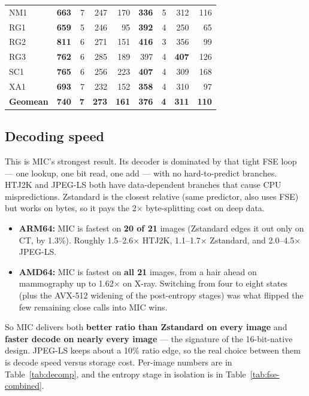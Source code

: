 \documentclass[11pt]{article}
\begin{document}
\begin{table}[htbp]
{\begin{tabular}{l|rrrr|rrrr}
NM1  & \textbf{663}   &  7 & 247 & 170 & \textbf{336} &  5 & 312          & 116 \\
RG1  & \textbf{659}   &  5 & 246 &  95 & \textbf{392} &  4 & 250          &  65 \\
RG2  & \textbf{811}   &  6 & 271 & 151 & \textbf{416} &  3 & 356          &  99 \\
RG3  & \textbf{762}   &  6 & 285 & 189 & 397          &  4 & \textbf{407} & 126 \\
SC1  & \textbf{765}   &  6 & 256 & 223 & \textbf{407} &  4 & 309          & 168 \\
XA1  & \textbf{693}   &  7 & 232 & 152 & \textbf{358} &  4 & 310          &  97 \\
\midrule
\textbf{Geomean} & \textbf{740} & \textbf{7} & \textbf{273} & \textbf{161} & \textbf{376} & \textbf{4} & \textbf{311} & \textbf{110} \\
\bottomrule
\end{tabular}}
\end{table}

\subsection{Decoding speed}

This is MIC's strongest result. Its decoder is dominated by that tight FSE
loop --- one lookup, one bit read, one add --- with no hard-to-predict
branches. HTJ2K and JPEG-LS both have data-dependent branches that cause CPU
mispredictions. Zstandard is the closest relative (same predictor, also uses
FSE) but works on bytes, so it pays the 2$\times$ byte-splitting cost on deep
data.

\begin{itemize}
  \item \textbf{ARM64:} MIC is fastest on \textbf{20 of 21} images (Zstandard
  edges it out only on CT, by 1.3\%). Roughly 1.5--2.6$\times$ HTJ2K,
  1.1--1.7$\times$ Zstandard, and 2.0--4.5$\times$ JPEG-LS.
  \item \textbf{AMD64:} MIC is fastest on \textbf{all 21} images, from a hair
  ahead on mammography up to 1.62$\times$ on X-ray. Switching from four to
  eight states (plus the AVX-512 widening of the post-entropy stages) was what
  flipped the few remaining close calls into MIC wins.
\end{itemize}

So MIC delivers both \textbf{better ratio than Zstandard on every image} and
\textbf{faster decode on nearly every image} --- the signature of the
16-bit-native design. JPEG-LS keeps about a 10\% ratio edge, so the real
choice between them is decode speed versus storage cost. Per-image numbers are
in Table~\ref{tab:decomp}, and the entropy stage in isolation is in
Table~\ref{tab:fse-combined}.
\end{document}

